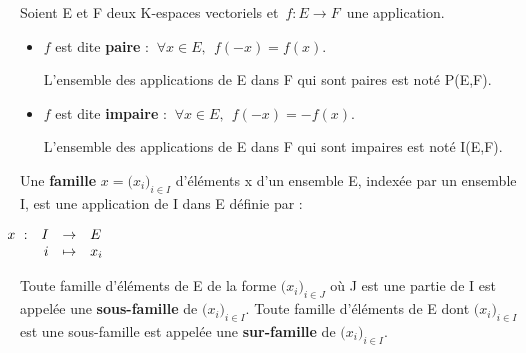 \vspace{1.2cm}

\noindent Soient E et F deux K-espaces vectoriels et \(\,f:E\to F\,\) une application.
\begin{itemize}[leftmargin=1cm, label=•]
\item \(f\) est dite \textbf{paire} \ssi : \(\ \forall x\in E, \ \ f(-x)=f(x)\). \vspace{0.1cm}\\
\begin{small}L'ensemble des applications de E dans F qui sont paires est noté P(E,F). \end{small} 

\item \(f\) est dite \textbf{impaire} \ssi : \(\ \forall x\in E, \ \ f(-x)=-f(x)\). \vspace{0.1cm}\\
\begin{small}L'ensemble des applications de E dans F qui sont impaires est noté I(E,F). \end{small}
\end{itemize}

\vspace{1.3cm}


Une \textbf{famille} \(x=\bigl(x_i\bigr)_{i\in I} \) d'éléments x d'un ensemble E, indexée par un ensemble I, est une application de I dans E définie par :\vspace{-0.65cm}
\begin{center}\(
\begin{array}{rrcl}
    \hspace{-2cm} x\ : & I & \to & E \\
     & i & \mapsto & x_i
\end{array}
\)\end{center}
\vspace{0.2cm}

Toute famille d'éléments de E de la forme \(\bigl(x_i\bigr)_{i\in J}\) où J est une partie de I est appelée une \textbf{sous-famille} de \(\bigl(x_i\bigr)_{i\in I}\). Toute famille d'éléments de E dont \(\bigl(x_i\bigr)_{i\in I}\) est une sous-famille est appelée une \textbf{sur-famille} de \(\bigl(x_i\bigr)_{i\in I}\).

\vspace{1cm}


